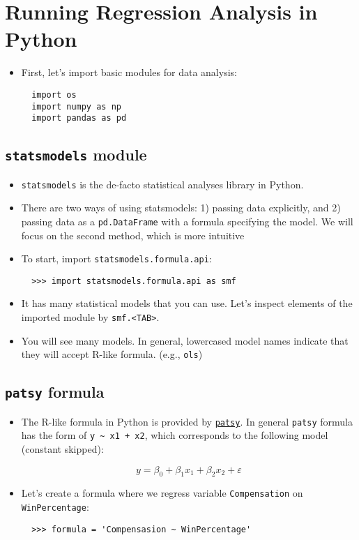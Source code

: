 \documentclass[10pt,article]{article}
\begin{document}
\section{Running Regression Analysis in Python}
\label{sec:org87a115c}
\begin{itemize}
\item First, let's import basic modules for data analysis:

\begin{verbatim}
  import os
  import numpy as np
  import pandas as pd
\end{verbatim}
\end{itemize}
\subsection{\texttt{statsmodels} module}
\label{sec:orgf8f4b5c}
\begin{itemize}
\item \texttt{statsmodels} is the de-facto statistical analyses library in Python.
\item There are two ways of using statsmodels: 1) passing data explicitly, and 2)
passing data as a \texttt{pd.DataFrame} with a formula specifying the model. We
will focus on the second method, which is more intuitive
\item To start, import \texttt{statsmodels.formula.api}:

\begin{verbatim}
  >>> import statsmodels.formula.api as smf
\end{verbatim}

\item It has many statistical models that you can use. Let's inspect elements of
the imported module by \texttt{smf.<TAB>}.
\item You will see many models. In general, lowercased model names indicate that
they will accept R-like formula. (e.g., \texttt{ols})
\end{itemize}
\subsection{\texttt{patsy} formula}
\label{sec:org61abb3f}
\begin{itemize}
\item The R-like formula in Python is provided by \href{https://patsy.readthedocs.io/en/latest/}{\texttt{patsy}}. In general \texttt{patsy}
formula has the form of \texttt{y \textasciitilde{} x1 + x2}, which corresponds to the following
model (constant skipped):

\[ y = \beta_0 + \beta_1 x_1 + \beta_2 x_2 + \varepsilon \]

\item Let's create a formula where we regress variable \texttt{Compensation} on \texttt{WinPercentage}:

\begin{verbatim}
  >>> formula = 'Compensasion ~ WinPercentage'
\end{verbatim}
\end{itemize}
\end{document}
